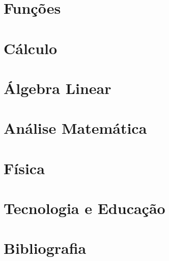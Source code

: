 \documentclass[11pt,fleqn]{book} %
\begin{document}






\part{Funções}						%



\part{Cálculo}				%




\part{Álgebra Linear}						%




\part{Análise Matemática}

\part{Física}
%
\part{Tecnologia e Educação}


\part{Bibliografia}						%


\end{document}
